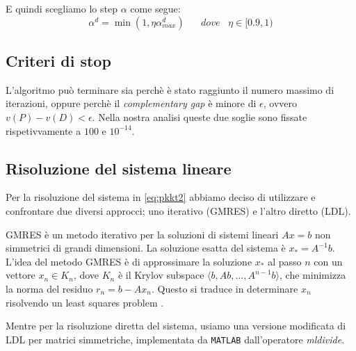 E quindi scegliamo lo step $\alpha$ come segue:
\begin{equation}\label{eq:alphaFinale}
\alpha^d = \min(1, \eta \alpha^d_{max}) \;\;\;\;\;\; dove\;\;\; \eta \in [0.9, 1)
\end{equation}


\subsection{Criteri di stop}\label{cap:stop}
L'algoritmo può terminare sia perchè è stato raggiunto il numero massimo di iterazioni, oppure perchè il \textit{complementary gap} è minore di $\epsilon$, ovvero $v(P)-v(D)<\epsilon$.
Nella nostra analisi queste due soglie sono fissate rispetivvamente a $100$ e $10^{-14}$.




\subsection{Risoluzione del sistema lineare}\label{cap:RISLS}
Per la risoluzione del sistema in \ref{eq:pkkt2} abbiamo deciso di utilizzare e confrontare due diversi approcci; uno iterativo (GMRES) e l'altro diretto (LDL).

GMRES è un metodo iterativo per la soluzioni di sistemi lineari $Ax=b$ non simmetrici di grandi dimensioni.
La soluzione esatta del sistema è $x_\ast = A^{-1}b$.
L'idea del metodo GMRES è di approssimare la soluzione $x_\ast$ al passo $n$ con un vettore $x_n \in K_n$, dove $K_n$ è il Krylov subspace $\langle b, Ab,\dots,A^{n-1}b\rangle$, che minimizza la norma del residuo $r_n = b - Ax_n$.
Questo si traduce in determinare $x_n$ risolvendo un least squares problem \cite{trefethen1997numerical}.

Mentre per la risoluzione diretta del sistema, usiamo una versione modificata di LDL per matrici simmetriche, implementata da \texttt{MATLAB} dall'operatore \textit{mldivide}.


